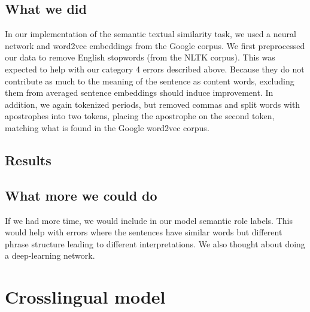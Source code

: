 \documentclass{article}
\begin{document}
\subsection{What we did}
In our implementation of the semantic textual similarity task, we used a neural network%
and word2vec embeddings from the Google corpus. We first preprocessed our data to remove English stopwords (from the NLTK corpus). This was expected to help with our category 4 errors described above. Because they do not contribute as much to the meaning of the sentence as content words, excluding them from averaged sentence embeddings should induce improvement. In addition, we again tokenized periods, but removed commas and split words with apostrophes into two tokens, placing the apostrophe on the second token, matching what is found in the Google word2vec corpus.


\subsection{Results}


\subsection{What more we could do}
If we had more time, we would include in our model semantic role labels. This would help with errors where the sentences have similar words but different phrase structure leading to different interpretations. We also thought about doing a deep-learning network.%



\section{Crosslingual model}
\end{document}

